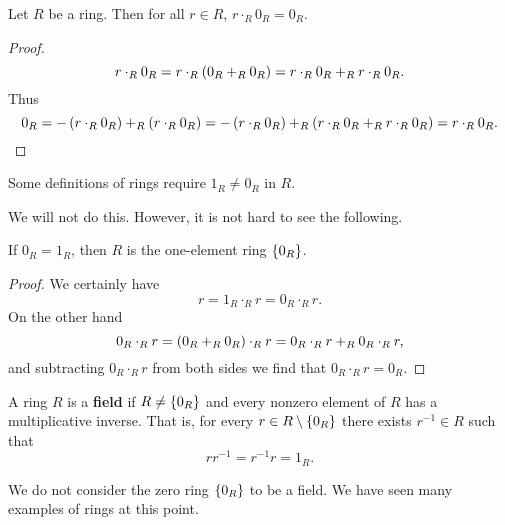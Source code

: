 \pagebreak

\begin{proposition}
Let $ R $ be a ring. Then for all $ r \in R $, $ r \cdot_R 0_R = 0_R $.
\end{proposition}

\begin{proof}
$$ r \cdot_R 0_R = r \cdot_R \left( 0_R +_R 0_R \right) = r \cdot_R 0_R +_R r \cdot_R 0_R. $$
Thus
$$ 0_R = -\left( r \cdot_R 0_R \right) +_R \left( r \cdot_R 0_R \right) = -\left( r \cdot_R 0_R \right) +_R \left( r \cdot_R 0_R +_R r \cdot_R 0_R \right) = r \cdot_R 0_R. $$
\end{proof}

\begin{note*}
Some definitions of rings require $ 1_R \ne 0_R $ in $ R $.
\end{note*}

We will not do this. However, it is not hard to see the following.

\begin{proposition}
If $ 0_R = 1_R $, then $ R $ is the one-element ring $ \left\{ 0_R \right\} $.
\end{proposition}

\begin{proof}
We certainly have
$$ r = 1_R \cdot_R r = 0_R \cdot_R r. $$
On the other hand
$$ 0_R \cdot_R r = \left( 0_R +_R 0_R \right) \cdot_R r = 0_R \cdot_R r +_R 0_R \cdot_R r, $$
and subtracting $ 0_R \cdot_R r $ from both sides we find that $ 0_R \cdot_R r = 0_R $.
\end{proof}

\begin{definition}
A ring $ R $ is a \textbf{field} if $ R \ne \left\{ 0_R \right\} $ and every nonzero element of $ R $ has a multiplicative inverse. That is, for every $ r \in R \setminus \left\{ 0_R \right\} $ there exists $ r^{-1} \in R $ such that
$$ rr^{-1} = r^{-1}r = 1_R. $$
\end{definition}

We do not consider the zero ring $ \left\{ 0_R \right\} $ to be a field. We have seen many examples of rings at this point.

